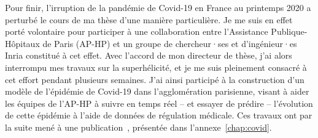 Pour finir, l'irruption de la pandémie de Covid-19 en France au printemps 2020 a perturbé le cours de ma thèse d'une manière particulière.
Je me suis en effet porté volontaire pour participer à une collaboration entre l'Assistance Publique-Hôpitaux de Paris (AP-HP) et un groupe de chercheur·ses et d'ingénieur·es Inria constitué à cet effet.
Avec l'accord de mon directeur de thèse, j'ai alors interrompu mes travaux sur la superhélicité, et je me suis pleinement consacré à cet effort pendant plusieurs semaines.
J'ai ainsi participé à la construction d'un modèle de l'épidémie de Covid-19 dans l'agglomération parisienne, visant à aider les équipes de l'AP-HP à suivre en temps réel -- et essayer de prédire -- l'évolution de cette épidémie à l'aide de données de régulation médicale.
Ces travaux ont par la suite mené à une publication~\citep{gaubert2020}, présentée dans l'annexe~\ref{chap:covid}.

